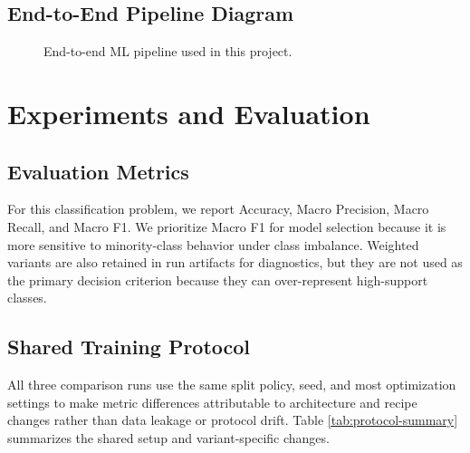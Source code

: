 \documentclass[11pt,a4paper]{article}
\begin{document}
\subsection{End-to-End Pipeline Diagram}
\begin{figure}[H]
\centering
{}
\caption{End-to-end ML pipeline used in this project.}
\label{fig:pipeline}
\end{figure}

\section{Experiments and Evaluation}
\subsection{Evaluation Metrics}
For this classification problem, we report Accuracy, Macro Precision, Macro Recall, and Macro F1. We prioritize Macro F1 for model selection because it is more sensitive to minority-class behavior under class imbalance. Weighted variants are also retained in run artifacts for diagnostics, but they are not used as the primary decision criterion because they can over-represent high-support classes.

\subsection{Shared Training Protocol}
All three comparison runs use the same split policy, seed, and most optimization settings to make metric differences attributable to architecture and recipe changes rather than data leakage or protocol drift. Table \ref{tab:protocol-summary} summarizes the shared setup and variant-specific changes.
\end{document}
